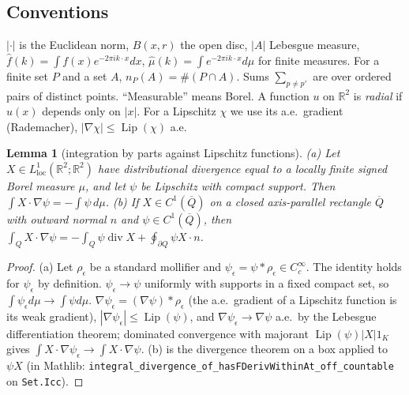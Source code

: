 \documentclass[11pt,reqno]{amsart}
\numberwithin{equation}{section}
\theoremstyle{plain}
\newtheorem{lemma}[theorem]{Lemma}
\theoremstyle{definition}
\newcommand{\R}{\mathbb{R}}
\newcommand{\dvg}{\operatorname{div}}
\newcommand{\Lip}{\operatorname{Lip}}
\begin{document}
\subsection{Conventions}\label{sec:conventions}
$|\cdot|$ is the Euclidean norm, $B(x,r)$ the open disc, $|A|$ Lebesgue measure, $\widehat f(k)=\int f(x)e^{-2\pi ik\cdot x}dx$, $\widehat\mu(k)=\int e^{-2\pi ik\cdot x}d\mu$ for finite measures.  For a finite set $P$ and a set $A$, $n_P(A)=\#(P\cap A)$.  Sums $\sum_{p\ne p'}$ are over ordered pairs of distinct points.  ``Measurable'' means Borel.  A function $u$ on $\R^2$ is \emph{radial} if $u(x)$ depends only on $|x|$.  For a Lipschitz $\chi$ we use its a.e.\ gradient (Rademacher), $|\nabla\chi|\le\Lip(\chi)$ a.e.

\begin{lemma}[integration by parts against Lipschitz functions]\label{lem:ibp}
\textup{(a)} Let $X\in L^1_{\mathrm{loc}}(\R^2;\R^2)$ have distributional divergence equal to a locally finite signed Borel measure $\mu$, and let $\psi$ be Lipschitz with compact support.  Then $\int X\cdot\nabla\psi=-\int\psi\,d\mu$.  \textup{(b)} If $X\in C^1(\overline{Q})$ on a closed axis-parallel rectangle $\overline Q$ with outward normal $n$ and $\psi\in C^1(\overline Q)$, then $\int_QX\cdot\nabla\psi=-\int_Q\psi\dvg X+\oint_{\partial Q}\psi X\cdot n$.
\end{lemma}
\begin{proof}
(a) Let $\rho_\epsilon$ be a standard mollifier and $\psi_\epsilon=\psi*\rho_\epsilon\in C_c^\infty$.  The identity holds for $\psi_\epsilon$ by definition.  $\psi_\epsilon\to\psi$ uniformly with supports in a fixed compact set, so $\int\psi_\epsilon d\mu\to\int\psi d\mu$.  $\nabla\psi_\epsilon=(\nabla\psi)*\rho_\epsilon$ (the a.e.\ gradient of a Lipschitz function is its weak gradient), $|\nabla\psi_\epsilon|\le\Lip(\psi)$, and $\nabla\psi_\epsilon\to\nabla\psi$ a.e.\ by the Lebesgue differentiation theorem; dominated convergence with majorant $\Lip(\psi)|X|1_{K}$ gives $\int X\cdot\nabla\psi_\epsilon\to\int X\cdot\nabla\psi$.  (b) is the divergence theorem on a box applied to $\psi X$ (in Mathlib: \texttt{integral\_divergence\_of\_hasFDerivWithinAt\_off\_countable} on \texttt{Set.Icc}).
\end{proof}
\end{document}
